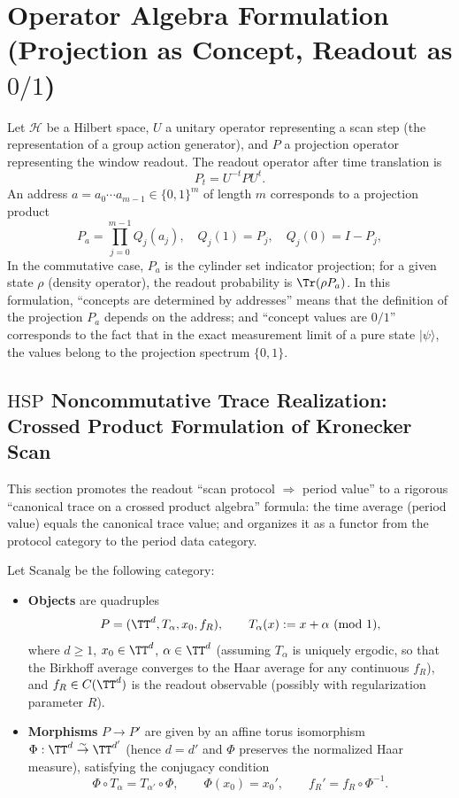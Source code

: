 \section{Operator Algebra Formulation (Projection as Concept, Readout as \texorpdfstring{$0/1$}{0/1})}
\label{app:op-algebra}

Let $\mathcal{H}$ be a Hilbert space, $U$ a unitary operator representing a scan step (the representation of a group action generator), and $P$ a projection operator representing the window readout. The readout operator after time translation is
\[
P_t=U^{-t}PU^t.
\]
An address $a=a_0\cdots a_{m-1}\in\{0,1\}^m$ of length $m$ corresponds to a projection product
\[
P_a=\prod_{j=0}^{m-1} Q_{j}(a_j),\quad
Q_{j}(1)=P_j,\quad Q_{j}(0)=I-P_j,
\]
In the commutative case, $P_a$ is the cylinder set indicator projection; for a given state $\rho$ (density operator), the readout probability is $\Tr(\rho P_a)$.
In this formulation, ``concepts are determined by addresses'' means that the definition of the projection $P_a$ depends on the address; and ``concept values are $0/1$'' corresponds to the fact that in the exact measurement limit of a pure state $\lvert\psi\rangle$, the values belong to the projection spectrum $\{0,1\}$.

\subsection{\texorpdfstring{$\mathrm{HSP}$}{HSP} Noncommutative Trace Realization: Crossed Product Formulation of Kronecker Scan}\label{app:op-algebra-hsp-trace}

This section promotes the readout ``scan protocol $\Rightarrow$ period value'' to a rigorous ``canonical trace on a crossed product algebra'' formula: the time average (period value) equals the canonical trace value; and organizes it as a functor from the protocol category to the period data category.

\begin{definition}\label{def:scanalg}
Let \(\mathrm{Scanalg}\) be the following category:
\begin{itemize}
  \item \textbf{Objects} are quadruples
  \[
  P=(\TT^d,T_\alpha,x_0,f_R),
  \qquad
  T_\alpha(x):=x+\alpha\ (\mathrm{mod}\ 1),
  \]
  where \(d\ge 1\), \(x_0\in\TT^d\), \(\alpha\in\TT^d\) (assuming \(T_\alpha\) is uniquely ergodic, so that the Birkhoff average converges to the Haar average for any continuous \(f_R\)), and \(f_R\in C(\TT^d)\) is the readout observable (possibly with regularization parameter \(R\)).
  \item \textbf{Morphisms} \(P\to P'\) are given by an affine torus isomorphism \(\Phi:\TT^d\overset{\sim}{\to}\TT^{d'}\) (hence \(d=d'\) and \(\Phi\) preserves the normalized Haar measure), satisfying the conjugacy condition
  \[
  \Phi\circ T_\alpha = T_{\alpha'}\circ \Phi,\qquad \Phi(x_0)=x_0',\qquad f_R'=f_R\circ \Phi^{-1}.
  \]
\end{itemize}
\end{definition}

